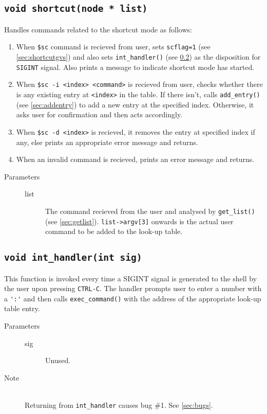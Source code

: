 \documentclass{article}
\begin{document}
\subsection{\lstinline{void shortcut(node * list)}} \label{sec:shortcut}
Handles commands related to the shortcut mode as follows:
\begin{enumerate}
	\item When \lstinline{$sc} command is recieved from user, sets \lstinline{scflag=1} (see \ref{sec:shortcutgvs}) and also sets \lstinline{int_handler()} (see \ref{sec:inthandler}) as the disposition for \lstinline{SIGINT} signal. Also prints a message to indicate shortcut mode has started.
	\item When \lstinline{$sc -i <index> <command>} is recieved from user, checks whether there is any existing entry at \lstinline{<index>} in the table. If there isn't, calls \lstinline{add_entry()} (see \ref{sec:addentry}) to add a new entry at the specified index. Otherwise, it asks user for confirmation and then acts accordingly.
	\item When \lstinline{$sc -d <index>} is recieved, it removes the entry at specified index if any, else prints an appropriate error message and returns.
	\item When an invalid command is recieved, prints an error message and returns.
\end{enumerate}
\begin{description}
	\item[Parameters]\hfill
	\begin{description}
		\item[list] The command recieved from the user and analysed by \lstinline{get_list()}(see \ref{sec:getlist}). \lstinline{list->argv[3]} onwards is the actual user command to be added to the look-up table. 
	\end{description}
\end{description}

\subsection{\lstinline{void int_handler(int sig)}} \label{sec:inthandler}
This function is invoked every time a SIGINT signal is generated to the shell by the user upon pressing \lstinline{CTRL-C}. The handler prompts user to enter a number with a \lstinline{':'} and then calls \lstinline{exec_command()} with the address of the appropriate look-up table entry.
\begin{description}
	\item[Parameters]\hfill
	\begin{description}
		\item[sig] Unused.
	\end{description}
	\item[Note]\hfill\\
		Returning from \lstinline{int_handler} causes bug \#1. See \ref{sec:bugs}.
\end{description}
\end{document}
